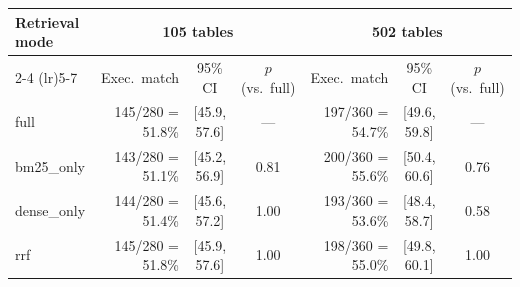 \begin{tabular}{lrccrcc}
\toprule
Retrieval mode & \multicolumn{3}{c}{105 tables} & \multicolumn{3}{c}{502 tables} \\
\cmidrule(lr){2-4} \cmidrule(lr){5-7}
 & Exec.\ match & 95\% CI & $p$ (vs.\ full) & Exec.\ match & 95\% CI & $p$ (vs.\ full) \\
\midrule
full & 145/280 = 51.8\% & [45.9, 57.6] & --- & 197/360 = 54.7\% & [49.6, 59.8] & --- \\
bm25\_only & 143/280 = 51.1\% & [45.2, 56.9] & 0.81 & 200/360 = 55.6\% & [50.4, 60.6] & 0.76 \\
dense\_only & 144/280 = 51.4\% & [45.6, 57.2] & 1.00 & 193/360 = 53.6\% & [48.4, 58.7] & 0.58 \\
rrf & 145/280 = 51.8\% & [45.9, 57.6] & 1.00 & 198/360 = 55.0\% & [49.8, 60.1] & 1.00 \\
\bottomrule
\end{tabular}
